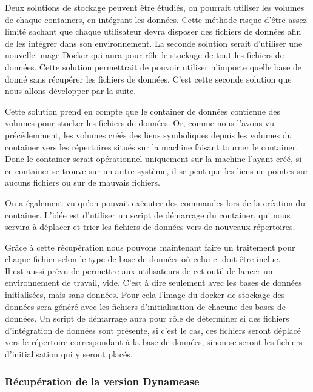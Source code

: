 Deux solutions de stockage peuvent être étudiés, on pourrait utiliser les volumes de chaque containers, en intégrant les données. Cette méthode risque d'être assez limité sachant que chaque utilisateur devra disposer des fichiers de données afin de les intégrer dans son environnement. La seconde solution serait d'utiliser une nouvelle image Docker qui aura pour rôle le stockage de tout les fichiers de données. Cette solution permettrait de pouvoir utiliser n'importe quelle base de donné sans récupérer les fichiers de données. C'est cette seconde solution que nous allons développer par la suite.

Cette solution prend en compte que le container de données contienne des volumes pour stocker les fichiers de données. Or, comme nous l'avons vu précédemment, les volumes créés des liens symboliques depuis les volumes du container vers les répertoires situés sur la machine faisant tourner le container. Donc le container serait opérationnel uniquement sur la machine l'ayant créé, si ce container se trouve sur un autre système, il se peut que les liens ne pointes sur aucuns fichiers ou sur de mauvais fichiers. 

On a également vu qu'on pouvait exécuter des commandes lors de la création du container. L'idée est d'utiliser un script de démarrage du container, qui nous servira à déplacer et trier les fichiers de données vers de nouveaux répertoires.

Grâce à cette récupération nous pouvons maintenant faire un traitement pour chaque fichier selon le type de base de données où celui-ci doit être inclue.\\

Il est aussi prévu de permettre aux utilisateurs de cet outil de lancer un environnement de travail, vide. C'est à dire seulement avec les bases de données initialisées, mais sans données. Pour cela l'image du docker de stockage des données sera généré avec les fichiers d'initialisation de chacune des bases de données. Un script de démarrage aura pour rôle de déterminer si des fichiers d'intégration de données sont présente, si c'est le cas, ces fichiers seront déplacé vers le répertoire correspondant à la base de données, sinon se seront les fichiers d'initialisation qui y seront placés. 

\subsubsection{Récupération de la version Dynamease}

